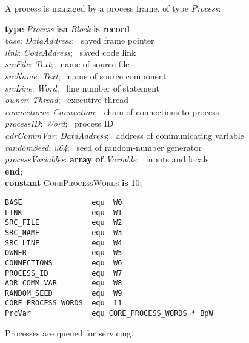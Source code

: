 A process is managed by a process frame, of type \emph{Process}:

\begin{tabbing}
\indents
\vb\>\textbf{type} \emph{Process} \textbf{isa} \emph{Block} \textbf{is} \textbf{record}\\
\vb\>\>\emph{base}: \emph{DataAddress};
   \>\>\>\>\>\>\>\>\>\> \rmk\ saved frame pointer\\
\vb\>\>\emph{link}: \emph{CodeAddress};
   \>\>\>\>\>\>\>\>\>\> \rmk\ saved code link\\
\vb\>\>\emph{srcFile}: \emph{Text};
   \>\>\>\>\>\>\>\>\>\> \rmk\ name of source file\\
\vb\>\>\emph{srcName}: \emph{Text};
   \>\>\>\>\>\>\>\>\>\> \rmk\ name of source component\\
\vb\>\>\emph{srcLine}: \emph{Word};
   \>\>\>\>\>\>\>\>\>\> \rmk\ line number of statement\\
\vb\>\>\emph{owner}: \emph{Thread};
   \>\>\>\>\>\>\>\>\>\> \rmk\ executive thread\\
\vb\>\>\emph{connections}: \emph{Connection};
   \>\>\>\>\>\>\>\>\>\> \rmk\ chain of connections to process \\
\vb\>\>\emph{processID}: \emph{Word};
   \>\>\>\>\>\>\>\>\>\> \rmk\ process ID\\
\vb\>\>\emph{adrCommVar}: \emph{DataAddress};
   \>\>\>\>\>\>\>\>\>\> \rmk\ address of communicating variable\\
\vb\>\>\emph{randomSeed}: \emph{u64};
   \>\>\>\>\>\>\>\>\>\> \rmk\ seed of random-number generator\\
\vb\>\>\emph{processVariables}: \textbf{array of} \emph{Variable};
   \>\>\>\>\>\>\>\>\>\> \rmk\ inputs and locals\\
\vb\>\textbf{end};\\
\vb\>\textbf{constant} \textsc{CoreProcessWords} \textbf{is} 10;
\end{tabbing}

{\small
\begin{verbatim}
BASE                equ  W0
LINK                equ  W1
SRC_FILE            equ  W2
SRC_NAME            equ  W3
SRC_LINE            equ  W4
OWNER               equ  W5
CONNECTIONS         equ  W6
PROCESS_ID          equ  W7
ADR_COMM_VAR        equ  W8
RANDOM_SEED         equ  W9
CORE_PROCESS_WORDS  equ  11
PrcVar              equ CORE_PROCESS_WORDS * BpW
\end{verbatim}}

Processes are queued for servicing.

